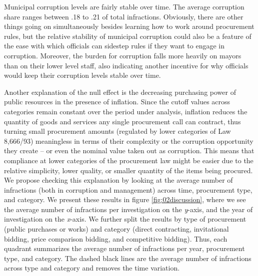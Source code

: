 \documentclass[11pt]{article}
\begin{document}
Municipal corruption levels are fairly stable over time. The average corruption share ranges between .18 to .21 of total infractions. Obviously, there are other things going on simultaneously besides learning how to work around procurement rules, but the relative stability of municipal corruption could also be a feature of the ease with which officials can sidestep rules if they want to engage in corruption. Moreover, the burden for corruption falls more heavily on mayors \citep{AvisGovernmentAuditsReduce2018} than on their lower level staff, also indicating another incentive for why officials would keep their corruption levels stable over time.

Another explanation of the null effect is the decreasing purchasing power of public resources in the presence of inflation. Since the cutoff values across categories remain constant over the period under analysis, inflation reduces the quantity of goods and services any single procurement call can contract, thus turning small procurement amounts (regulated by lower categories of Law 8,666/93) meaningless in terms of their complexity or the corruption opportunity they create -- or even the nominal value taken out as corruption. This means that compliance at lower categories of the procurement law might be easier due to the relative simplicity, lower quality, or smaller quantity of the items being procured. We propose checking this explanation by looking at the average number of infractions (both in corruption and management) across time, procurement type, and category. We present these results in figure \ref{fig:02discussion}, where we see the average number of infractions per investigation on the \emph{y}-axis, and the year of investigation on the \emph{x}-axis. We further split the results by type of procurement (public purchases or works) and category (direct contracting, invitational bidding, price comparison bidding, and competitive bidding). Thus, each quadrant summarizes the average number of infractions per year, procurement type, and category. The dashed black lines are the average number of infractions across type and category and removes the time variation.
\end{document}
